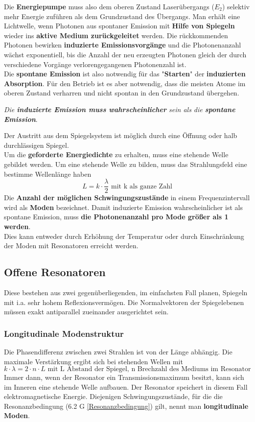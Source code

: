 \documentclass[12pt,a4paper,ngerman]{article}
\begin{document}
Die \textbf{Energiepumpe} muss also dem oberen Zustand Laserübergangs ($E_2$) selektiv mehr Energie zuführen als dem Grundzustand des Übergangs. Man erhält eine Lichtwelle, wenn Photonen aus spontaner Emission mit \textbf{Hilfe von Spiegeln} wieder ins \textbf{aktive Medium zurückgeleitet} werden. Die rückkommenden Photonen bewirken \textbf{induzierte Emissionsvorgänge} und die Photonenanzahl wächst exponentiell, bis die Anzahl der neu erzeugten Photonen gleich der durch verschiedene Vorgänge verlorengegangenen Photonenzahl ist. \\
Die \textbf{spontane Emission} ist also notwendig für das "\textbf{Starten}" der \textbf{induzierten Absorption}. Für den Betrieb ist es aber notwendig, dass die meisten Atome im oberen Zustand verharren und nicht spontan in den Grundzustand übergehen. 
\begin{center}
\textit{Die \textbf{induzierte Emission muss wahrscheinlicher} sein als die \textbf{spontane Emission}}. 
\end{center}
Der Austritt aus dem Spiegelsystem ist möglich durch eine Öffnung oder halb durchlässigen Spiegel. \\
Um die \textbf{geforderte Energiedichte} zu erhalten, muss eine stehende Welle gebildet werden. Um eine stehende Welle zu bilden, muss das Strahlungsfeld eine bestimme Wellenlänge haben 
\begin{equation}
L = k \cdot \frac{\lambda}{2} \text{ mit k als ganze Zahl}
\end{equation}
Die \textbf{Anzahl der möglichen Schwingungszustände} in einem Frequenzintervall wird als \textbf{Moden} bezeichnet. Damit induzierte Emission wahrscheinlicher ist als spontane Emission, muss \textbf{die Photonenanzahl pro Mode größer als 1 werden}. \\
Dies kann entweder durch Erhöhung der Temperatur oder durch Einschränkung der Moden mit Resonatoren erreicht werden. 


\subsection{Offene Resonatoren}

Diese bestehen aus zwei gegenüberliegenden, im einfachsten Fall planen, Spiegeln mit i.a. sehr hohem Reflexionsvermögen. Die Normalvektoren der Spiegelebenen müssen exakt antiparallel zueinander ausgerichtet sein. 
\subsubsection*{Longitudinale Modenstruktur}
Die Phasendifferenz zwischen zwei Strahlen ist von der Länge abhängig. Die maximale Verstärkung ergibt sich bei stehenden Wellen mit 
\begin{equation}
k \cdot \lambda = 2 \cdot n \cdot L \text{ mit L Abstand der Spiegel, n Brechzahl des Mediums im Resonator}
\label{Resonanzbedingung}
\end{equation}
Immer dann, wenn der Resonator ein Transmissionsmaximum besitzt, kann sich im Inneren eine stehende Welle aufbauen. Der Resonator speichert in diesem Fall elektromagnetische Energie. 
Diejenigen Schwingungszustände, für die die Resonanzbedingung (6.2 G \ref{Resonanzbedingung}) gilt, nennt man \textbf{longitudinale Moden}. 
\end{document}
